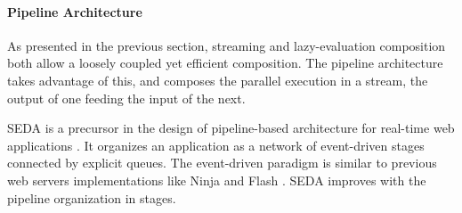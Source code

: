 












\paragraph{Pipeline Architecture}

As presented in the previous section, streaming and lazy-evaluation composition both allow a loosely coupled yet efficient composition.
The pipeline architecture takes advantage of this, and composes the parallel execution in a stream, the output of one feeding the input of the next.

SEDA is a precursor in the design of pipeline-based architecture for real-time web applications \cite{Welsh2001}.
It organizes an application as a network of event-driven stages connected by explicit queues.
The event-driven paradigm is similar to previous web servers implementations like Ninja and Flash \cite{Gribble2001,Pai1999}.
SEDA improves with the pipeline organization in stages.

